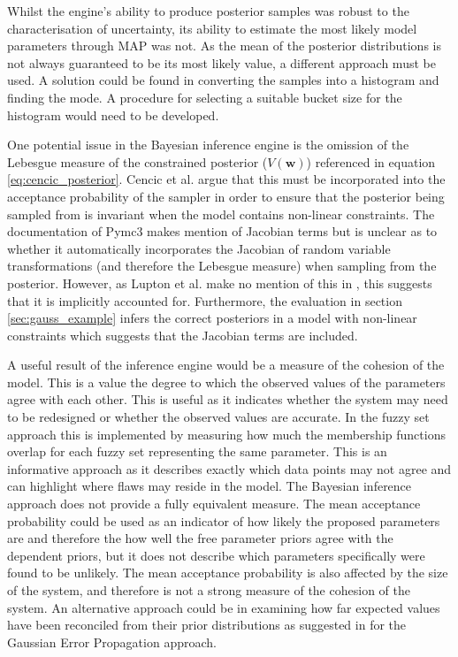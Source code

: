 \documentclass[ %
                    author={Tom Jager},
                supervisor={Dr. Daniel Schien},
                    degree={MEng},
                     title={A Bayesian Inference Engine for Calibrating Uncertainty over UMIS Structured MFA Systems},
                  subtitle={},
                      type={research},
                      year={2019} ]{dissertation}
\begin{document}
Whilst the engine's ability to produce posterior samples was robust to the characterisation of uncertainty, its ability to estimate the most likely model parameters through MAP was not. As the mean of the posterior distributions is not always guaranteed to be its most likely value, a different approach must be used. A solution could be found in converting the samples into a histogram and finding the mode. A procedure for selecting a suitable bucket size for the histogram would need to be developed.

One potential issue in the Bayesian inference engine is the omission of the Lebesgue measure of the constrained posterior ($V(\bm{w})$) referenced in equation \ref{eq:cencic_posterior}. Cencic et al. argue that this must be incorporated into the acceptance probability of the sampler in order to ensure that the posterior being sampled from is invariant when the model contains non-linear constraints. The documentation of Pymc3 makes mention of Jacobian terms but is unclear as to whether it automatically incorporates the Jacobian of random variable transformations (and therefore the Lebesgue measure) when sampling from the posterior. However, as Lupton et al. make no mention of this in \cite{lupton2018incremental}, this suggests that it is implicitly accounted for. Furthermore, the evaluation in section \ref{sec:gauss_example} infers the correct posteriors in a model with non-linear constraints which suggests that the Jacobian terms are included.

A useful result of the inference engine would be a measure of the cohesion of the model. This is a value the degree to which the observed values of the parameters agree with each other. This is useful as it indicates whether the system may need to be redesigned or whether the observed values are accurate. In the fuzzy set approach this is implemented by measuring how much the membership functions overlap for each fuzzy set representing the same parameter. This is an informative approach as it describes exactly which data points may not agree and can highlight where flaws may reside in the model. The Bayesian inference approach does not provide a fully equivalent measure. The mean acceptance probability could be used as an indicator of how likely the proposed parameters are and therefore the how well the free parameter priors agree with the dependent priors, but it does not describe which parameters specifically were found to be unlikely. The mean acceptance probability is also affected by the size of the system, and therefore is not a strong measure of the cohesion of the system. An alternative approach could be in examining how far expected values have been reconciled from their prior distributions as suggested in \cite{cencic2008material} for the Gaussian Error Propagation approach.
\end{document}
